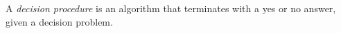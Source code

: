 
A \textit{decision procedure} is an algorithm that terminates with a yes or no answer, given a decision problem.\cite{decisionproceduresbook} 













